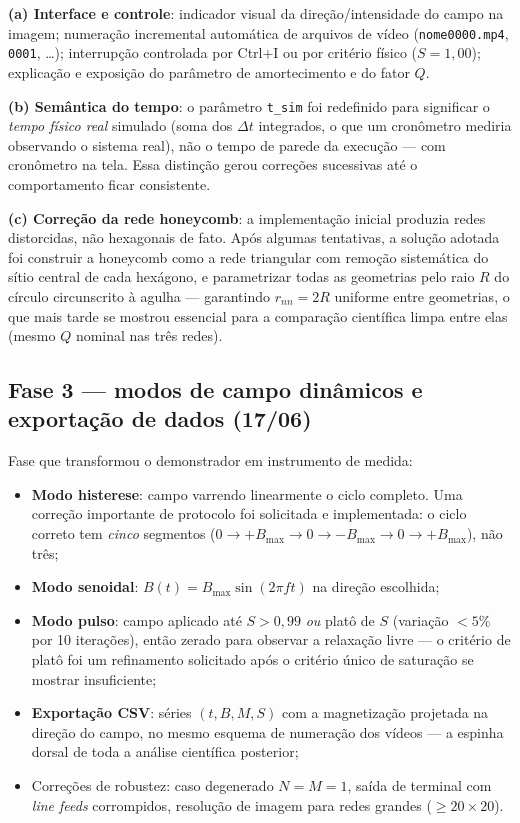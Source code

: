 \documentclass[11pt,a4paper]{article}
\newcommand{\code}[1]{\texttt{#1}}
\begin{document}
\textbf{(a) Interface e controle}: indicador visual da direção/intensidade
do campo na imagem; numeração incremental automática de arquivos de
vídeo (\code{nome0000.mp4}, \code{0001}, \dots); interrupção controlada
por \mbox{Ctrl+I} ou por critério físico ($S = 1{,}00$); explicação e
exposição do parâmetro de amortecimento e do fator $Q$.

\textbf{(b) Semântica do tempo}: o parâmetro \code{t\_sim} foi
redefinido para significar o \emph{tempo físico real} simulado (soma dos
$\Delta t$ integrados, o que um cronômetro mediria observando o sistema
real), não o tempo de parede da execução --- com cronômetro na tela.
Essa distinção gerou correções sucessivas até o comportamento ficar
consistente.

\textbf{(c) Correção da rede honeycomb}: a implementação inicial
produzia redes distorcidas, não hexagonais de fato. Após algumas
tentativas, a solução adotada foi construir a honeycomb como a rede
triangular com remoção sistemática do sítio central de cada hexágono, e
parametrizar todas as geometrias pelo raio $R$ do círculo circunscrito à
agulha --- garantindo $r_{nn} = 2R$ uniforme entre geometrias, o que
mais tarde se mostrou essencial para a comparação científica limpa entre
elas (mesmo $Q$ nominal nas três redes).

\subsection{Fase 3 --- modos de campo dinâmicos e exportação de dados
(17/06)}

Fase que transformou o demonstrador em instrumento de medida:

\begin{itemize}
\item \textbf{Modo histerese}: campo varrendo linearmente o ciclo
completo. Uma correção importante de protocolo foi solicitada e
implementada: o ciclo correto tem \emph{cinco} segmentos ($0 \to +B_{\max}
\to 0 \to -B_{\max} \to 0 \to +B_{\max}$), não três;
\item \textbf{Modo senoidal}: $B(t) = B_{\max}\sin(2\pi f t)$ na direção
escolhida;
\item \textbf{Modo pulso}: campo aplicado até $S > 0{,}99$ \emph{ou}
platô de $S$ (variação $<5\%$ por 10 iterações), então zerado para
observar a relaxação livre --- o critério de platô foi um refinamento
solicitado após o critério único de saturação se mostrar insuficiente;
\item \textbf{Exportação CSV}: séries $(t, B, M, S)$ com a magnetização
projetada na direção do campo, no mesmo esquema de numeração dos vídeos
--- a espinha dorsal de toda a análise científica posterior;
\item Correções de robustez: caso degenerado $N = M = 1$, saída de
terminal com \emph{line feeds} corrompidos, resolução de imagem para
redes grandes ($\geq 20 \times 20$).
\end{itemize}
\end{document}
